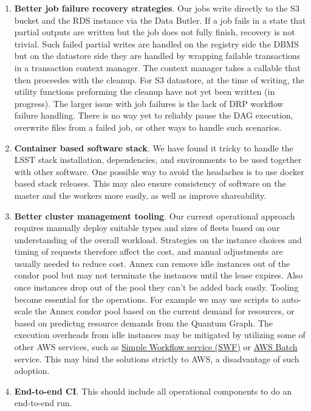 \begin{enumerate}
\item \textbf{Better job failure recovery strategies}.
Our jobs write directly to the S3 bucket and the RDS instance via the Data Butler.
If a job fails in a state that partial outputs are written but the job does not fully finish, recovery is not trivial.
Such failed partial writes are handled on the registry side the DBMS but on the datastore side they are handled by wrapping failable transactions in a transaction context manager.
The context manager takes a callable that then proceedes with the cleanup.
For S3 datastore, at the time of writing, the utility functions preforming the cleanup have not yet been written (in progress).
The larger issue with job failures is the lack of DRP workflow failure handling.
There is no way yet to reliably pause the DAG execution, overwrite files from a failed job, or other ways to handle such scenarios.
\item \textbf{Container based software stack}.
We have found it tricky to handle the LSST stack installation, dependencies, and environments to be used together with other software.
One possible way to avoid the headaches is to use docker based stack releases.
This may also ensure consistency of software on the master and the workers more easily, as well as improve shareability.
\item \textbf{Better cluster management tooling}.
Our current operational approach requires manually deploy suitable types and sizes of fleets based on our understanding of the overall workload.
Strategies on the instance choices and timing of requests therefore affect the cost, and manual adjustments are usually needed to reduce cost.
Annex can remove idle instances out of the condor pool but may not terminate the instances until the lease expires.
Also once instances drop out of the pool they can't be added back easily.
Tooling become essential for the operations.
For example we may use scripts to auto-scale the Annex condor pool based on the current demand for resources, or based on predictng resource demands from the Quantum Graph.
The execution overheads from idle instances may be mitigated by utilizing some of other AWS services, such as \href{https://aws.amazon.com/swf/}{Simple Workflow service (SWF)} or \href{https://aws.amazon.com/batch/}{AWS Batch} service.
This may bind the solutions strictly to AWS, a disadvantage of such adoption.
\item \textbf{End-to-end CI}.
This should include all operational components to do an end-to-end run.

\end{enumerate}
